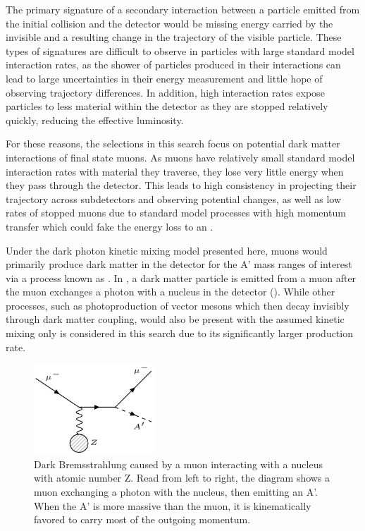 The primary signature of a secondary interaction between a particle emitted from the initial collision and the detector would be missing energy carried by the invisible \aprime and a resulting change in the trajectory of the visible particle.
These types of signatures are difficult to observe in particles with large standard model interaction rates, as the shower of particles produced in their interactions can lead to large uncertainties in their energy measurement and little hope of observing trajectory differences.
In addition, high interaction rates expose particles to less material within the detector as they are stopped relatively quickly, reducing the effective luminosity.

For these reasons, the selections in this search focus on potential dark matter interactions of final state muons.
As muons have relatively small standard model interaction rates with material they traverse, they lose very little energy when they pass through the detector.
This leads to high consistency in projecting their trajectory across subdetectors and observing potential changes, as well as low rates of stopped muons due to standard model processes with high momentum transfer which could fake the energy loss to an \aprime.

Under the dark photon kinetic mixing model presented here, muons would primarily produce dark matter in the detector for the A' mass ranges of interest via a process known as \dbrem.
In \dbrem, a dark matter particle is emitted from a muon after the muon exchanges a photon with a nucleus in the detector ().
While other processes, such as photoproduction of vector mesons which then decay invisibly through dark matter coupling, would also be present with the assumed kinetic mixing only \dbrem is considered in this search due to its significantly larger production rate.

\begin{figure}[ht]
	\centering
	\includegraphics[width=0.4\textwidth]{figures/dbrem_feyn_diagram.jpg}
        \caption[Dark Bremsstrahlung Feynman Diagram]{Dark Bremsstrahlung caused by a muon interacting with a nucleus with atomic number Z. Read from left to right, the diagram shows a muon exchanging a photon with the nucleus, then emitting an A'. When the A' is more massive than the muon, it is kinematically favored to carry most of the outgoing momentum.}
	\label{fig:dbrem_feyn}
\end{figure}

